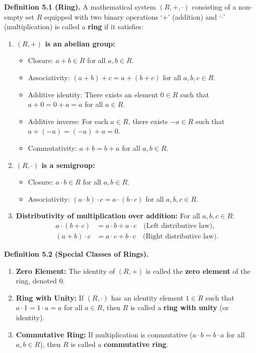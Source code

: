 \documentclass[11pt,a4paper]{article}
\begin{document}
\begin{defbox}
\textbf{Definition 5.1 (Ring).} A mathematical system $(R, +, \cdot)$ consisting of a non-empty set $R$ equipped with two binary operations `$+$' (addition) and `$\cdot$' (multiplication) is called a \textbf{ring} if it satisfies:
\begin{enumerate}[label=\textbf{\arabic*)}]
    \item \textbf{$(R, +)$ is an abelian group:}
    \begin{itemize}
        \item Closure: $a + b \in R$ for all $a, b \in R$.
        \item Associativity: $(a + b) + c = a + (b + c)$ for all $a, b, c \in R$.
        \item Additive identity: There exists an element $0 \in R$ such that $a + 0 = 0 + a = a$ for all $a \in R$.
        \item Additive inverse: For each $a \in R$, there exists $-a \in R$ such that $a + (-a) = (-a) + a = 0$.
        \item Commutativity: $a + b = b + a$ for all $a, b \in R$.
    \end{itemize}
    \item \textbf{$(R, \cdot)$ is a semigroup:}
    \begin{itemize}
        \item Closure: $a \cdot b \in R$ for all $a, b \in R$.
        \item Associativity: $(a \cdot b) \cdot c = a \cdot (b \cdot c)$ for all $a, b, c \in R$.
    \end{itemize}
    \item \textbf{Distributivity of multiplication over addition:} For all $a, b, c \in R$:
    \begin{align*}
        a \cdot (b + c) &= a \cdot b + a \cdot c \quad \text{(Left distributive law)}, \\
        (a + b) \cdot c &= a \cdot c + b \cdot c \quad \text{(Right distributive law)}.
    \end{align*}
\end{enumerate}
\end{defbox}

\begin{defbox}
\textbf{Definition 5.2 (Special Classes of Rings).}
\begin{enumerate}[label=\textbf{\arabic*)}]
    \item \textbf{Zero Element:} The identity of $(R, +)$ is called the \textbf{zero element} of the ring, denoted $0$.
    \item \textbf{Ring with Unity:} If $(R, \cdot)$ has an identity element $1 \in R$ such that $a \cdot 1 = 1 \cdot a = a$ for all $a \in R$, then $R$ is called a \textbf{ring with unity} (or identity).
    \item \textbf{Commutative Ring:} If multiplication is commutative ($a \cdot b = b \cdot a$ for all $a, b \in R$), then $R$ is called a \textbf{commutative ring}.
\end{enumerate}
\end{defbox}
\end{document}
